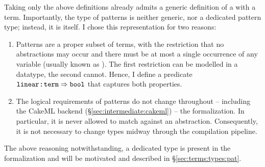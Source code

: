 Taking only the above definitions already admits a generic definition of  a  with a term.
Importantly, the type of patterns is neither generic, nor a dedicated pattern type; instead, it is  itself.
I chose this representation for two reasons:
\begin{enumerate}
  \item
    Patterns are a proper subset of terms, with the restriction that no abstractions may occur and there must be at most a single occurrence of any variable (usually known as ).
    The first restriction can be modelled in a datatype, the second cannot.
    Hence, I define a predicate $\texttt{\textup{linear}} \mathbin{:\!\!:} \texttt{\textup{term}} \Rightarrow \texttt{\textup{bool}}$ that captures both properties.
  \item
    The logical requirements of patterns do not change throughout -- including the CakeML backend (§\ref{sec:intermediate:cakeml}) -- the formalization.
    In particular, it is never allowed to match against an abstraction.
    Consequently, it is not necessary to change types midway through the compilation pipeline.
\end{enumerate}

\noindent
The above reasoning notwithstanding, a dedicated  type is present in the formalization and will be motivated and described in §\ref{sec:terms:types:pat}.

